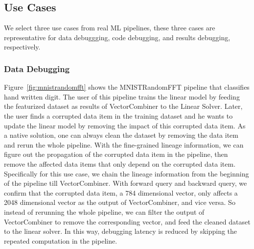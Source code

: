 \documentclass{sig-alternate}
\begin{document}
\subsection{Use Cases}
We select three use cases from real ML pipelines, these three cases are representative for data debuggging, code debugging, and results debugging, respectively.

\subsubsection{Data Debugging}
Figure~\ref{fig:mnistrandomfft} shows the MNISTRandomFFT pipeline that classifies hand written digit. 
The user of this pipeline trains the linear model by feeding the featurized dataset as results of VectorCombiner to the Linear Solver.
Later, the user finds a corrupted data item in the training dataset and he wants to update the linear model by removing the impact
of this corrupted data item. 
As a native solution, one can always clean the dataset by removing the data item and rerun the whole pipeline.
With the fine-grained lineage information, we can figure out the propagation of the corrupted data item in the pipeline,
then remove the affected data items that only depend on the corrupted data item.
Specifically for this use case, we chain the lineage information from the beginning of the pipeline till VectorCombiner.
With forward query and backward query, we confirm that the corrupted data item, a 784 dimensional vector, only affects
a 2048 dimensional vector as the output of VectorCombiner, and vice versa. So instead of rerunning the whole pipeline, 
we can filter the output of VectorCombiner to remove the corresponding vector, and feed the cleaned dataset to the linear solver.
In this way, debugging latency is reduced by skipping the repeated computation in the pipeline.
\end{document}
